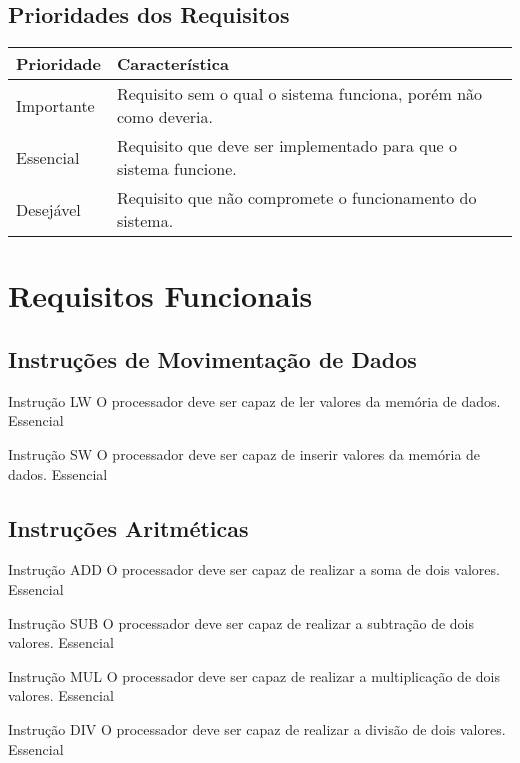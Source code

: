 \documentclass{article}
\begin{document}
  \subsection{Prioridades dos Requisitos}
    \FloatBarrier
    \begin{table}[H]
      \begin{center}
        \begin{tabular}[pos]{|m{2cm} | m{12cm}|} 
          \hline
          \cellcolor[gray]{0.9}\textbf{Prioridade} & \cellcolor[gray]{0.9}\textbf{Característica} \\ \hline
          Importante      & Requisito sem o qual o sistema funciona, porém não como deveria.  \\ \hline
          Essencial       & Requisito que deve ser implementado para que o sistema funcione.  \\ \hline
          Desejável       & Requisito que não compromete o funcionamento do sistema.  \\ \hline
        \end{tabular}
      \end{center}
    \end{table}  

  \section{Requisitos Funcionais}
  \subsection{Instruções de Movimentação de Dados}
    \begin{functional}
     \requirement
      {Instrução LW}
      {O processador deve ser capaz de ler valores da memória de dados.}
      {Essencial}
    
     \requirement
      {Instrução SW}
      {O processador deve ser capaz de inserir valores da memória de dados.}
      {Essencial}
    \end{functional}
    
    \subsection{Instruções Aritméticas}
    \begin{functional}
    
     \requirement
      {Instrução ADD}
      {O processador deve ser capaz de realizar a soma de dois valores.}
      {Essencial}
    
     \requirement
      {Instrução SUB}
      {O processador deve ser capaz de realizar a subtração de dois valores.}
      {Essencial}
      
      \requirement
      {Instrução MUL}
      {O processador deve ser capaz de realizar a multiplicação de dois valores.}
      {Essencial}
      
       \requirement
      {Instrução DIV}
      {O processador deve ser capaz de realizar a divisão de dois valores.}
      {Essencial}
    \end{functional}
\end{document}
